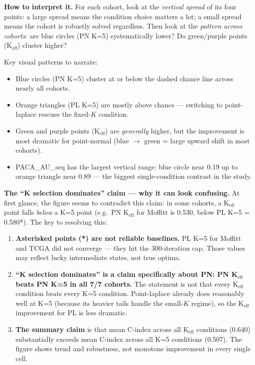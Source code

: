 \documentclass[11pt]{article}
\begin{document}
\textbf{How to interpret it.} For each cohort, look at the \emph{vertical spread} of its four points: a large spread means the condition choice matters a lot; a small spread means the cohort is robustly solved regardless. Then look at the \emph{pattern across cohorts}: are blue circles (PN K=5) systematically lower? Do green/purple points (K$_\text{eff}$) cluster higher?

Key visual patterns to narrate:
\begin{itemize}
  \item Blue circles (PN K=5) cluster at or below the dashed chance line across nearly all cohorts.
  \item Orange triangles (PL K=5) are mostly above chance --- switching to point-laplace rescues the fixed-$K$ condition.
  \item Green and purple points (K$_\text{eff}$) are \emph{generally} higher, but the improvement is most dramatic for point-normal (blue $\to$ green = large upward shift in most cohorts).
  \item PACA\_AU\_seq has the largest vertical range: blue circle near 0.19 up to orange triangle near 0.89 --- the biggest single-condition contrast in the study.
\end{itemize}

\textbf{The ``K selection dominates'' claim --- why it can look confusing.} At first glance, the figure seems to contradict this claim: in some cohorts, a K$_\text{eff}$ point falls \emph{below} a K=5 point (e.g.\ PN K$_\text{eff}$ for Moffitt is 0.530, below PL K=5 = 0.580*). The key to resolving this:
\begin{enumerate}
  \item \textbf{Asterisked points (*) are not reliable baselines.} PL K=5 for Moffitt and TCGA did not converge --- they hit the 300-iteration cap. Those values may reflect lucky intermediate states, not true optima.
  \item \textbf{``K selection dominates'' is a claim specifically about PN: PN K$_\text{eff}$ beats PN K=5 in all 7/7 cohorts.} The statement is not that every K$_\text{eff}$ condition beats every K=5 condition. Point-laplace already does reasonably well at K=5 (because its heavier tails handle the small-$K$ regime), so the K$_\text{eff}$ improvement for PL is less dramatic.
  \item \textbf{The summary claim} is that mean C-index across all K$_\text{eff}$ conditions (0.640) substantially exceeds mean C-index across all K=5 conditions (0.507). The figure shows trend and robustness, not monotone improvement in every single cell.
\end{enumerate}
\end{document}
